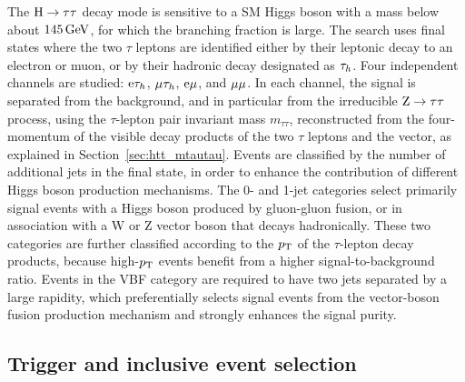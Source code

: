 \documentclass[12pt,twoside,a4paper,cmspaper,final,collab]{cms-tdr}
\begin{document}
The $\mathrm{H}\to\tau\tau$ decay mode is sensitive to a SM Higgs boson with a mass below about $145\,\text{Ge\hspace{-.08em}V}$,
for which the branching fraction is large.
The search uses final states where the two $\tau$ leptons are identified either by their leptonic decay to an electron or muon,
or by their hadronic decay designated as $\tau_h$.
Four independent channels are studied: $\mathrm{e}\tau_h$, ${\mu}\tau_h$, $\mathrm{e}{\mu}$, and  ${\mu}{\mu}$.
In each channel, the signal is separated from the background, and in particular from the irreducible $\mathrm{Z}\to\tau\tau$ process,
using the $\tau$-lepton pair invariant mass $m_{\tau\tau}$, reconstructed from the four-momentum of the visible decay products of the two $\tau$ leptons and the \MET vector,  as explained in Section~\ref{sec:htt_mtautau}.
Events are classified by the number of additional jets in the final state, in order to enhance the contribution of different
Higgs boson production mechanisms.
The 0- and 1-jet categories select primarily signal events with a Higgs boson produced by gluon-gluon fusion,
or in association with a W or Z vector boson that decays hadronically.
These two categories are further classified according to the $p_{\mathrm{T}}$ of the $\tau$-lepton decay products,
because high-$p_{\mathrm{T}}$ events benefit from a higher signal-to-background ratio.
Events in the VBF category are required to have two jets separated by a large rapidity,
which preferentially selects signal events from the vector-boson fusion production mechanism and strongly enhances the signal purity.


\subsection{Trigger and inclusive event selection}
\end{document}
